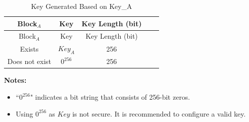 \begin{longtable}[c]{ |c|c|c|c|c| }
\caption{Key Generated Based on Key\_A}
\label{tab:extmemencr-key-possibility}
\\\hline 
\rowcolor{lightgray}
Block$_A$ & Key & Key Length (bit) \\\hline
\endfirsthead
\hline
\rowcolor{lightgray}
Block$_A$ & Key & Key Length (bit) \\\hline
\endhead
\endfoot
Exists       &   $\mathit{Key}_{A}$    &   256   \\\hline
Does not exist        &   $0^{256}$    &   256   \\\hline
\end{longtable}
\vspace{-1.5em}
{\bfseries Notes: }\\
\begin{itemize}
    \item ``$0^{256}$" indicates a bit string that consists of 256-bit zeros. 
    \item Using $0^{256}$ as $\mathit{Key}$ is not secure. It is recommended to configure a valid key.
\end{itemize}
